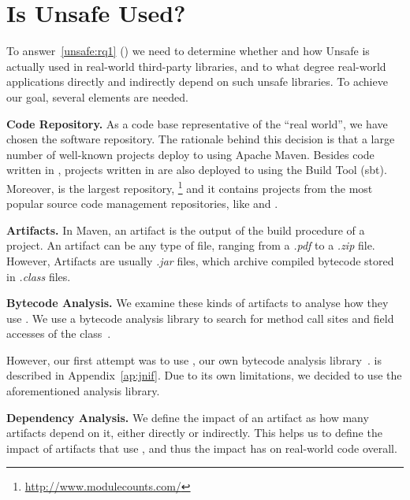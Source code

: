 \section{Is Unsafe Used?}
\label{sec:unsafe:overview}

To answer~\ref{unsafe:rq1} (\emph{\urqA})
we need to determine whether and how Unsafe is actually used in real-world third-party \java{} libraries,
and to what degree real-world applications directly and indirectly depend on such unsafe libraries.
To achieve our goal, several elements are needed.

\textbf{Code Repository.}
As a code base representative of the ``real world'',
we have chosen the \mavencentral{} software repository.
The rationale behind this decision is that a large number of well-known \java{} projects deploy to \mavencentral{} using Apache Maven.
Besides code written in \java{},
projects written in  are also deployed to \mavencentral{} using the \scala{} Build Tool (sbt).
Moreover, \mavencentral{} is the largest \java{} repository,%
\footnote{\url{http://www.modulecounts.com/}}
and it contains projects from the most popular source code management repositories, like \github{} and \sourceforge{}.

\textbf{Artifacts.}
In Maven, an artifact is the output of the build procedure of a project.
An artifact can be any type of file, ranging from a \emph{.pdf} to a \emph{.zip} file.
However, Artifacts are usually \emph{.jar} files,
which archive compiled \java{} bytecode stored in \emph{.class} files.

\textbf{Bytecode Analysis.}
We examine these kinds of artifacts to analyse how they use .
We use a bytecode analysis library to search for method call sites and field accesses of the  class~\citep{brunetonRecursiveDynamicSoftware2002,brunetonASMCodeManipulation2002,kuleshovUsingASMFramework2007}.

However, our first attempt was to use \jnif{},
our own bytecode analysis library~\citep{mastrangeloJNIFJavaNative2014}.
\jnif{} is described in Appendix~\ref{ap:jnif}.
Due to its own limitations,
we decided to use the aforementioned analysis library.

\textbf{Dependency Analysis.}
We define the impact of an artifact as how many artifacts depend on it,
either directly or indirectly.
This helps us to define the impact of artifacts that use ,
and thus the impact  has on real-world code overall.

